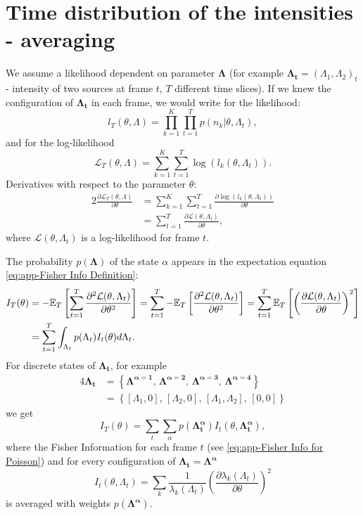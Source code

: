 \section{Time distribution of the intensities - averaging\label{sec:Appendix - blinking not integrated}}
We assume a likelihood dependent on parameter $\bm{\Lambda}$ (for example $\bm{\Lambda_t}=(\Lambda_1,\Lambda_2)_t$ - intensity of two sources at frame $t$, $T$ different time slices). If we knew the configuration of $\bm{\Lambda_t}$ in each frame, we would write for the likelihood: 
%
\begin{equation}
	l_T(\theta,\Lambda)=\prod_{k=1}^K\prod_{t=1}^Tp(n_k|\theta,\Lambda_t),
\end{equation}
%
and for the log-likelihood
%
\begin{equation}
	\mathcal{L}_T(\theta,\Lambda)=\sum_{k=1}^K\sum_{t=1}^T\log\left(l_k(\theta,\Lambda_t)\right).
\end{equation}
%
Derivatives with respect to the parameter $\theta$:
%
\begin{alignat*}{2}
	\frac{\partial\mathcal{L}_T(\theta,\Lambda)}{\partial \theta}
	&=\sum_{k=1}^K\sum_{t=1}^T\frac{\partial\log\left(l_k(\theta,\Lambda_t)\right)}{\partial \theta}\\
	&=\sum_{t=1}^T\frac{\partial\mathcal{L}(\theta,\Lambda_t)}{\partial \theta}, 
\end{alignat*}
%
where $\mathcal{L}(\theta,\Lambda_t)$ is a log-likelihood for frame $t$.

The probability $p(\bm{\Lambda})$ of the state $\alpha$ appears in the expectation equation \autoref{eq:app-Fisher Info Definition}:
%
\begin{alignat*}{2}
	I_T(\theta) 
	& =-\mathbb{E}_T\left[\sum_{t=1}^T\frac{\partial^2\mathcal{L}(\theta,\Lambda_t)}{\partial \theta^2}\right]=\sum_{t=1}^T-\mathbb{E}_T\left[\frac{\partial^2\mathcal{L}(\theta,\Lambda_t)}{\partial \theta^2}\right]=\sum_{t=1}^T\mathbb{E}_T\left[\left(\frac{\partial\mathcal{L}(\theta,\Lambda_t)}{\partial \theta}\right)^2\right]\\
	& =\sum_{t=1}^T\int_{\Lambda_t}p(\Lambda_t)I_t(\theta)d\Lambda_t.
\end{alignat*}
%
For discrete states of $\bm{\Lambda_t}$, for example  
%
\begin{alignat*}{4}
	\bm{\Lambda_t}
	&=\left\{\bm{\Lambda^{\alpha=1}},\,\bm{\Lambda^{\alpha=2}},\,\bm{\Lambda^{\alpha=3}},\,\bm{\Lambda^{\alpha=4}}\right\}\\
	&=\left\{[\Lambda_1,0],\,[\Lambda_2,0],\,[\Lambda_1,\Lambda_2],\,[0,0]\right\}
\end{alignat*}	
% 
we get
\begin{equation}
	I_T(\theta)=\sum_t\sum_{\alpha}p(\bm{\Lambda^{\alpha}_t})I_t(\theta,\bm{\Lambda^{\alpha}_{t}}),
\end{equation}
%
where the Fisher Information for each frame $t$ (see \autoref{eq:app-Fisher Info for Poisson}) and for every configuration of $\bm{\Lambda_t=\Lambda^\alpha}$
%
\begin{equation}
	I_t(\theta,\Lambda_t)=\sum_k\frac{1}{\lambda_k(\Lambda_t)}\left(\frac{\partial\lambda_k(\Lambda_t)}{\partial \theta}\right)^2
\end{equation}
%
 is averaged with weights $p(\bm{\Lambda^\alpha})$. 

